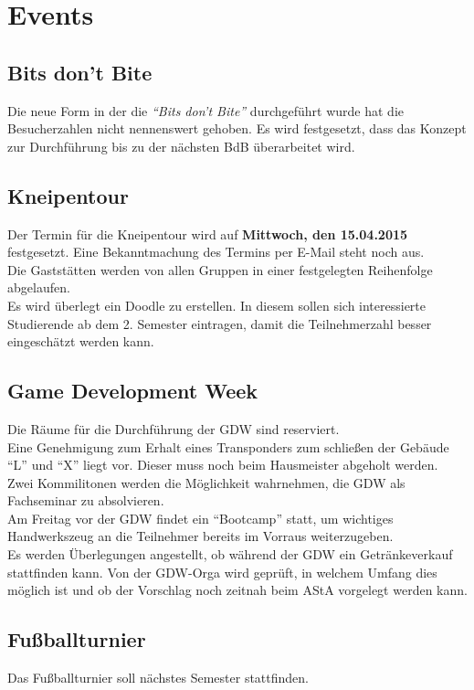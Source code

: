 \documentclass[a4paper, 11pt]{article} %
\begin{document}
\section{Events}
\subsection{Bits don't Bite}
Die neue Form in der die \textit{"`Bits don't Bite"'} durchgeführt wurde hat die Besucherzahlen nicht nennenswert gehoben. Es wird festgesetzt, dass das Konzept zur Durchführung bis zu der nächsten BdB überarbeitet wird.

\subsection{Kneipentour}
Der Termin für die Kneipentour wird auf \textbf{Mittwoch, den 15.04.2015} festgesetzt. Eine Bekanntmachung des Termins per E-Mail steht noch aus.\\
Die Gaststätten werden von allen Gruppen in einer festgelegten Reihenfolge abgelaufen.\\
Es wird überlegt ein Doodle zu erstellen. In diesem sollen sich interessierte Studierende ab dem 2. Semester eintragen, damit die Teilnehmerzahl besser eingeschätzt werden kann.

\subsection{Game Development Week}
Die Räume für die Durchführung der GDW sind reserviert.\\
Eine Genehmigung zum Erhalt eines Transponders zum schließen der Gebäude "`L"' und "`X"' liegt vor. Dieser muss noch beim Hausmeister abgeholt werden.\\
Zwei Kommilitonen werden die Möglichkeit wahrnehmen, die GDW als Fachseminar zu absolvieren.\\
Am Freitag vor der GDW findet ein "`Bootcamp"' statt, um wichtiges Handwerkszeug an die Teilnehmer bereits im Vorraus weiterzugeben.\\
Es werden Überlegungen angestellt, ob während der GDW ein Getränkeverkauf stattfinden kann. Von der GDW-Orga wird geprüft, in welchem Umfang dies möglich ist und ob der Vorschlag noch zeitnah beim AStA vorgelegt werden kann.

\subsection{Fußballturnier}
Das Fußballturnier soll nächstes Semester stattfinden.
\end{document}
